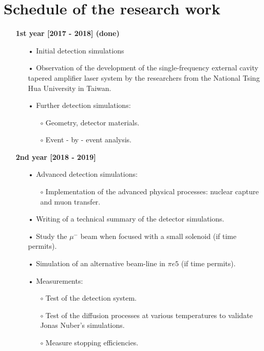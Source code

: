 \documentclass[12pt]{article}
\begin{document}
\section{Schedule of the research work}
\begin{itemize}
\item[]
\textbf{1st year [2017 - 2018] (done)}
\begin{itemize}
\item[•]
	Initial detection simulations
\item[•]
	Observation of the development of the single-frequency external cavity tapered amplifier laser system by the researchers from the National Tsing Hua University in Taiwan. 	
\item[•]
	Further detection simulations:
	\begin{itemize}
		\item[$\circ$]
		Geometry, detector materials.
		\item[$\circ$]
		Event - by - event analysis.	
	\end{itemize}
\end{itemize}
\item[]
\textbf{2nd year [2018 - 2019]}
\begin{itemize}
\item[•]	
    Advanced detection simulations:
    \begin{itemize}
    		\item[$\circ$]
    		Implementation of the advanced physical processes: nuclear capture and muon transfer.
    \end{itemize}
\item[•]
    Writing of a technical summary of the detector simulations. 
\item[•]    
	Study the $\mu^{-}$ beam when focused with a small solenoid (if time permits). 
\item[•]
	Simulation of an alternative beam-line in $\pi{e}5$ (if time permits).	 
\item[•]
    Measurements:
    \begin{itemize}
    \item[$\circ$]
	Test of the detection system.
	\item[$\circ$]
	Test of the diffusion processes at various temperatures to validate Jonas Nuber's simulations. 
	\item[$\circ$]
	Measure stopping efficiencies.
	\end{itemize}

\end{itemize}
\end{itemize}
\end{document}
